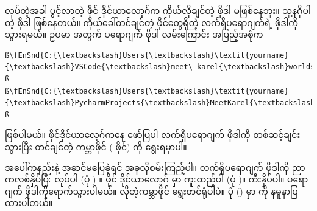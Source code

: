  လုပ်တဲ့အခါ ပွင့်လာတဲ့ ဖိုင် ဒိုင်ယာလော့ဂ်က ကိုယ်လိုချင်တဲ့  ဖိုဒါ မဖြစ်နေဘူး။ သူ့နဂိုပါတဲ့  ဖိုဒါ ဖြစ်နေတယ်။ ကိုယ်ခေါ်တင်ချင်တဲ့ ဖိုင်တွေရှိတဲ့ လက်ရှိပရောဂျက်ရဲ့  ဖိုဒါကို သွားရမယ်။ ဥပမာ  အတွက်  ပရောဂျက်  ဖိုဒါ လမ်းကြောင်း အပြည့်အစုံက
%
\begin{verbatim}
ß\fEnSnd{C:{\textbackslash}Users{\textbackslash}\textit{yourname}{\textbackslash}VSCode{\textbackslash}meet\_karel{\textbackslash}worlds}ß
ß\fEnSnd{C:{\textbackslash}Users{\textbackslash}\textit{yourname}{\textbackslash}PycharmProjects{\textbackslash}MeetKarel{\textbackslash}worlds}ß
\end{verbatim}
%
ဖြစ်ပါမယ်။ ဖိုင်ဒိုင်ယာလေ့ဂ်ကနေ ဖော်ပြပါ လက်ရှိပရောဂျက်  ဖိုဒါကို တစ်ဆင့်ချင်း သွားပြီး တင်ချင်တဲ့ ကမ္ဘာဖိုင် ( ဖိုင်) ကို ရွေးရမှာပါ။

အပေါ်ကနည်းနဲ့ အဆင်မပြေခဲ့ရင် အခုလိုစမ်းကြည့်ပါ။ လက်ရှိပရောဂျက်  ဖိုဒါကို ညာကလစ်နှိပ်ပြီး  လုပ်ပါ (ပုံ \fRefNo{\ref{fig:cpwldfld}}) ။ ဖိုင် ဒိုင်ယာလော့ဂ်  မှာ ကူးထည့်ပါ (ပုံ \fRefNo{\ref{fig:pstepth}})။  ကီးနှိပ်ပါ။ ပရောဂျက်  ဖိုဒါကိုရောက်သွားပါမယ်။ လိုတဲ့ကမ္ဘာဖိုင် ရွေးတင်ရုံပါပဲ။ ပုံ (\fRefNo{\ref{fig:prjwlds}}) မှာ   ကို နမူနာပြထားပါတယ်။

\begin{figure}[tbh!]
\caption{} 
\label{fig:cpwldfld}
\end{figure}

